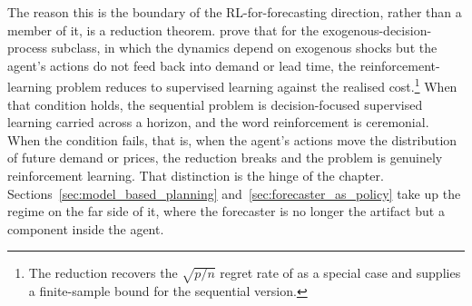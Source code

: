 The reason this is the boundary of the RL-for-forecasting direction,
rather than a member of it, is a reduction theorem.
\citet{Madeka2022DeepInventory} prove that for the exogenous-decision-process
subclass, in which the dynamics depend on exogenous shocks but the agent's
actions do not feed back into demand or lead time, the
reinforcement-learning problem reduces to supervised learning against the
realised cost.\footnote{The reduction recovers the $\sqrt{p/n}$ regret
rate of \citet{BanRudin2019} as a special case and supplies a
finite-sample bound for the sequential version.} When that condition
holds, the sequential problem is decision-focused supervised learning
carried across a horizon, and the word reinforcement is ceremonial. When
the condition fails, that is, when the agent's actions move the
distribution of future demand or prices, the reduction breaks and the
problem is genuinely reinforcement learning. That distinction is the
hinge of the chapter. Sections~\ref{sec:model_based_planning}
and~\ref{sec:forecaster_as_policy} take up the regime on the far side of
it, where the forecaster is no longer the artifact but a component inside
the agent.
